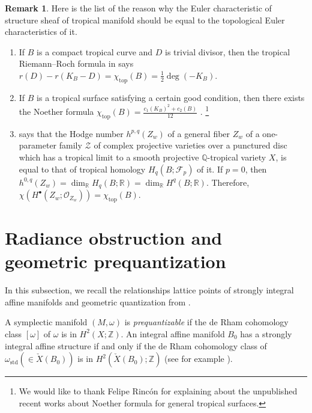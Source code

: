 \documentclass[a4paper,dvipdfmx,reqno,12pt]{amsart}
\makeatletter
\newcommand{\ind}[2]{\emph{#1}\index{1{#2}@{#1}}}
\theoremstyle{definition}
\newtheorem{remark}[theorem]{Remark}
\newcommand{\Z}{\mathbb{Z}}%
\newcommand{\opn}[1]{\operatorname{#1}}
\newcommand{\myfootnote}[1]{\hspace{-5pt}\footnote{#1}}
\numberwithin{equation}{section}
\makeatother
\begin{document}
\begin{remark} \label{remark-list-tropical-euler}
Here is the list of the reason why the Euler 
characteristic of structure sheaf of tropical manifold
should be equal to the topological Euler characteristics of it.
\begin{enumerate}
\item If $B$ is a compact tropical curve and $D$ 
is trivial divisor, then the tropical Riemann--Roch 
formula in 
\cite{gathmannRiemannRochTheoremTropical2008a}
says $r(D)-r(K_B-D)=\chi_{\opn{top}}(B)=\frac{1}{2}\opn{deg}(-K_B)$. 
\item If $B$ is a tropical surface satisfying a certain 
good condition, then there exists the Noether formula
$\chi_{\opn{top}}(B)=\frac{c_1(K_B)^{2} +c_2(B)}{12}$ 
\cite[Theorem 5.1]{shawTropicalSurfaces2015a}.
\myfootnote{We would like to thank Felipe Rinc\'on 
for explaining about the unpublished recent works
about Noether formula for general tropical surfaces.
}
\item 
\cite[Corollary 2]{itenbergTropicalHomology2019b} says 
that the Hodge number $h^{p,q}(Z_w)$ of a general fiber $Z_w$ of
a one-parameter family $\mathcal{Z}$ of 
complex projective varieties over a punctured disc which 
has a tropical limit to a smooth projective 
$\mathbb{Q}$-tropical variety $X$, 
is equal to that of tropical homology 
$H_{q}(B;\mathcal{F}_p)$ of it. If $p=0$, then
$h^{0,q}(Z_w)=\dim_{\mathbb{R}}H_{q}(B;\mathbb{R})
=\dim_{\mathbb{R}} H^{q}(B;\mathbb{R})$.
Therefore, $\chi(H^{\bullet}(Z_w;\mathcal{O}_{Z_w}))=
\chi_{\opn{top}}(B)$.
\end{enumerate}

\end{remark}



\section{Radiance obstruction and geometric prequantization}
\label{sec: BSRR}
\label{appendix-geometric-quantization}

In this subsection, we recall the relationships lattice points of 
strongly integral affine manifolds and geometric quantization 
from \cite{1999math......2027T,MR3525095}.

A symplectic manifold $(M,\omega)$ is \ind{prequantizable}{prequantizable}
if the de Rham cohomology class $[\omega]$ of $\omega$ is in $H^2(X;\Z)$. 
An integral affine manifold $B_0$ has a strongly integral affine structure 
if and only if the de Rham cohomology class of 
$\omega_{\opn{std}}(\in \check{X}(B_0))$ is in 
$H^{2}(\check{X}(B_0);\mathbb{Z})$
(see for example 
\cite[Lemma 2.8]{MR4275791}).
\end{document}
